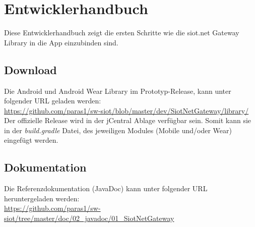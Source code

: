 \chapter{Entwicklerhandbuch}
Diese Entwicklerhandbuch zeigt die ersten Schritte wie die siot.net Gateway Library in die App einzubinden sind.
\section{Download}
Die Android und Android Wear Library im Prototyp-Release, kann unter folgender URL geladen werden:\\
\url{https://github.com/paras1/sw-siot/blob/master/dev/SiotNetGateway/library/}\\
Der offizielle Release wird in der jCentral Ablage verfügbar sein. Somit kann sie in der \textit{build.gradle} Datei, des jeweiligen Modules (Mobile und/oder Wear) eingefügt werden.
\section{Dokumentation}
Die Referenzdokumentation (JavaDoc) kann unter folgender URL heruntergeladen werden:\\ \url{https://github.com/paras1/sw-siot/tree/master/doc/02_javadoc/01_SiotNetGateway}
